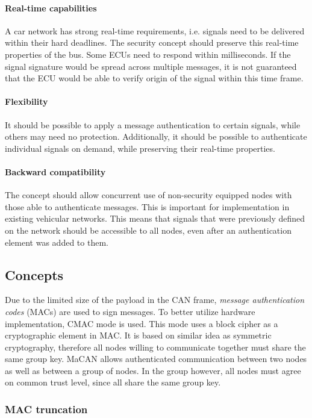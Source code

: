 \documentclass{article}
\begin{document}
\paragraph{Real-time capabilities}
A car network has strong real-time requirements, i.e. signals need to be delivered within their hard deadlines. The security concept should preserve this real-time properties of the bus. Some ECUs need to respond within milliseconds. If the signal signature would be spread across multiple messages, it is not guaranteed that the ECU would be able to verify origin of the signal within this time frame.

\paragraph{Flexibility}
It should be possible to apply a message authentication to certain signals, while others may need no protection. Additionally, it should be possible to authenticate individual signals on demand, while preserving their real-time properties.

\paragraph{Backward compatibility}
The concept should allow concurrent use of non-security equipped nodes with those able to authenticate messages. This is important for implementation in existing vehicular networks. This means that signals that were previously defined on the network should be accessible to all nodes, even after an authentication element was added to them.

\subsection{Concepts}
Due to the limited size of the payload in the CAN frame, \emph{message authentication codes} (MACs) are used to sign messages. To better utilize hardware implementation, CMAC mode is used. This mode uses a block cipher as a cryptographic element in MAC. It is based on similar idea as symmetric cryptography, therefore all nodes willing to communicate together must share the same group key. MaCAN allows authenticated communication between two nodes as well as between a group of nodes. In the group however, all nodes must agree on common trust level, since all share the same group key.

\subsubsection{MAC truncation}
\end{document}
